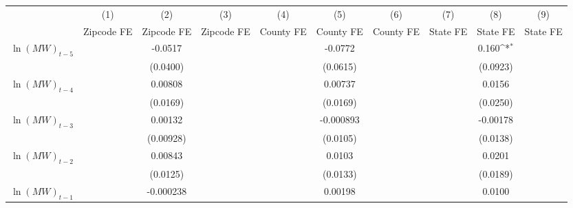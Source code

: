 {
\def\sym#1{\ifmmode^{#1}\else\(^{#1}\)\fi}
\begin{tabular}{l*{9}{c}}
\hline\hline
          &\multicolumn{1}{c}{(1)}&\multicolumn{1}{c}{(2)}&\multicolumn{1}{c}{(3)}&\multicolumn{1}{c}{(4)}&\multicolumn{1}{c}{(5)}&\multicolumn{1}{c}{(6)}&\multicolumn{1}{c}{(7)}&\multicolumn{1}{c}{(8)}&\multicolumn{1}{c}{(9)}\\
          &\multicolumn{1}{c}{Zipcode FE}&\multicolumn{1}{c}{Zipcode FE}&\multicolumn{1}{c}{Zipcode FE}&\multicolumn{1}{c}{County FE}&\multicolumn{1}{c}{County FE}&\multicolumn{1}{c}{County FE}&\multicolumn{1}{c}{State FE}&\multicolumn{1}{c}{State FE}&\multicolumn{1}{c}{State FE}\\
\hline
$\ln(MW)_{t-5}$&                  &  -0.0517         &                  &                  &  -0.0772         &                  &                  &    0.160\sym{*}  &                  \\
          &                  & (0.0400)         &                  &                  & (0.0615)         &                  &                  & (0.0923)         &                  \\
[1em]
$\ln(MW)_{t-4}$&                  &  0.00808         &                  &                  &  0.00737         &                  &                  &   0.0156         &                  \\
          &                  & (0.0169)         &                  &                  & (0.0169)         &                  &                  & (0.0250)         &                  \\
[1em]
$\ln(MW)_{t-3}$&                  &  0.00132         &                  &                  &-0.000893         &                  &                  & -0.00178         &                  \\
          &                  &(0.00928)         &                  &                  & (0.0105)         &                  &                  & (0.0138)         &                  \\
[1em]
$\ln(MW)_{t-2}$&                  &  0.00843         &                  &                  &   0.0103         &                  &                  &   0.0201         &                  \\
          &                  & (0.0125)         &                  &                  & (0.0133)         &                  &                  & (0.0189)         &                  \\
[1em]
$\ln(MW)_{t-1}$&                  &-0.000238         &                  &                  &  0.00198         &                  &                  &   0.0100         &                  \\

\end{tabular}}
